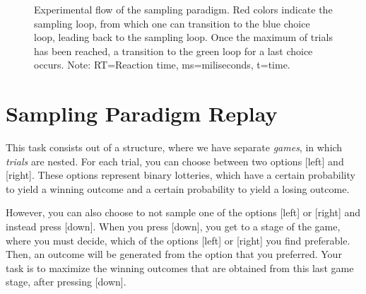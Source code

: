 \documentclass[12pt, oneside]{scrartcl}
\newcommand{\descrTextWidth}{4cm}
\begin{document}
\begin{figure}[h!]
\begin{center}
{
} %

\captionsetup{width=.9\linewidth, format=plain}
\caption[Flow Sampling Paradigm]{Experimental flow of the sampling paradigm. Red colors indicate the sampling loop, from which one can transition to the blue choice loop, leading back to the sampling loop. Once the maximum of trials has been reached, a transition to the green loop for a last choice occurs. Note: RT=Reaction time, ms=miliseconds, t=time. }
\label{fig:spFlow}
\end{center}
\end{figure}


\pagebreak
\section{Sampling Paradigm Replay}

This task consists out of a structure, where we have separate \textit{games}, in which \textit{trials} are nested. For each trial, you can choose between two options [left] and [right]. These options represent binary lotteries, which have a certain probability to yield a winning outcome and a certain probability to yield a losing outcome. \vspace{\baselineskip}

However, you can also choose to not sample one of the options [left] or [right] and instead press [down]. When you press [down], you get to a stage of the game, where you must decide, which of the options [left] or [right] you find preferable. Then, an outcome will be generated from the option that you preferred. Your task is to maximize the winning outcomes that are obtained from this last game stage, after pressing [down]. \vspace{\baselineskip}
\end{document}
